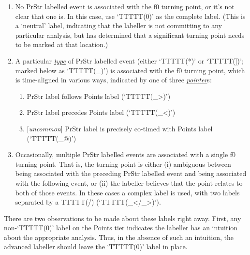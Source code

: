 \documentclass[11pt, twoside]{memoir}
\begin{document}
\begin{enumerate} \def\labelenumi{\arabic{enumi}.}
\item No PrStr labelled event is associated with the f0 turning point, or it’s not clear that one is. In this case, use ‘TTTTT(0)’ as the complete label. (This is a ‘neutral’ label, indicating that the labeller is not committing to any particular analysis, but has determined that a significant turning point needs to be marked at that location.)
\item A particular \textit{\uline{type}} of PrStr labelled event (either ‘TTTTT(*)’ or ‘TTTTT(])’; marked below as ‘TTTTT(\_)’) is associated with the f0 turning point, which is time-aligned in various ways, indicated by one of three \textit{\uline{pointer}}s:

 \begin{enumerate} \def\labelenumii{\alph{enumii}.}
\item PrStr label follows Points label (‘TTTTT(\_>)’)
\item PrStr label precedes Points label (‘TTTTT(\_<)’)
\item {[\textit{uncommon}]} PrStr label is precisely co-timed with Points label (‘TTTTT(\_@)’) \end{enumerate}
\item Occasionally, multiple PrStr labelled events are associated with a single f0 turning point. That is, the turning point is either (i) ambiguous between being associated with the preceding PrStr labelled event and being associated with the following event, or (ii) the labeller believes that the point relates to both of those events. In these cases a complex label is used, with two labels separated by a TTTTT(/) (‘TTTTT(\_</\_>)’). \end{enumerate}

There are two observations to be made about these labels right away. First, any non-‘TTTTT(0)’ label on the Points tier indicates the labeller has an intuition about the appropriate analysis. Thus, in the absence of such an intuition, the advanced labeller should leave the ‘TTTTT(0)’ label in place.
\end{document}
